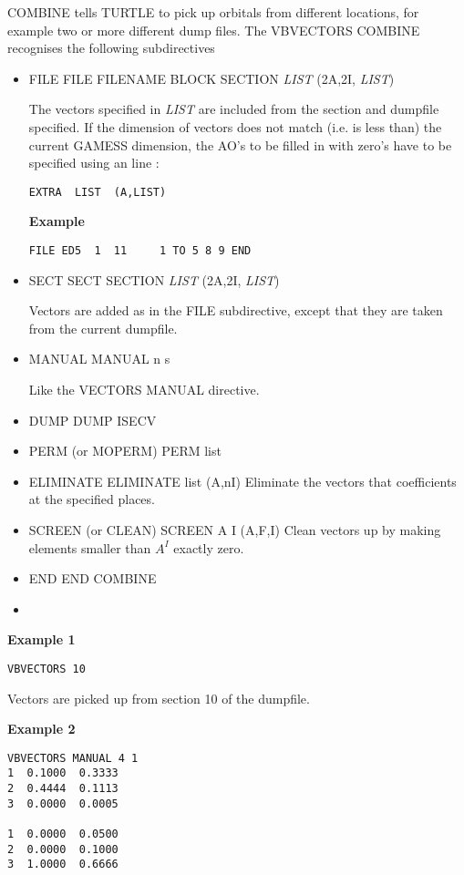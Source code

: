 \documentclass[11pt,fleqn]{article}
\begin{document}
COMBINE tells TURTLE to pick up orbitals from different locations, for example two or more different
dump files. The VBVECTORS  COMBINE recognises the following subdirectives 
\begin{itemize}
\item FILE
FILE FILENAME BLOCK SECTION   \textit{LIST} (2A,2I, \textit{LIST})

The vectors specified in   \textit{LIST}  are included from the section and dumpfile specified.
If the dimension of vectors does not match (i.e. is less than) the current GAMESS dimension, the AO's
to be filled in with zero's have to be specified using an line :
\begin{verbatim}
EXTRA  LIST  (A,LIST)
\end{verbatim}

{\bf Example } 
\begin{verbatim}
FILE ED5  1  11     1 TO 5 8 9 END
\end{verbatim}

\item SECT
SECT SECTION   \textit{LIST} (2A,2I, \textit{LIST})

Vectors are added as in the FILE subdirective, except that they are taken from the current dumpfile.

\item MANUAL
MANUAL n s

Like the VECTORS MANUAL directive.\

\item DUMP
DUMP ISECV
\item PERM (or MOPERM)
PERM list
\item ELIMINATE
ELIMINATE list (A,nI)
Eliminate the vectors that coefficients at the specified places.
\item SCREEN (or CLEAN)
SCREEN A  I (A,F,I)
Clean vectors up by making elements smaller than $A^I$ exactly zero.
\item END
END COMBINE
\item 
\end{itemize}


{\bf Example 1}
\begin{verbatim}
VBVECTORS 10
\end{verbatim}

Vectors are picked up from section 10 of the dumpfile.

{\bf Example 2 }
\begin{verbatim}
VBVECTORS MANUAL 4 1
1  0.1000  0.3333 
2  0.4444  0.1113
3  0.0000  0.0005

1  0.0000  0.0500
2  0.0000  0.1000
3  1.0000  0.6666
\end{verbatim}
\end{document}
